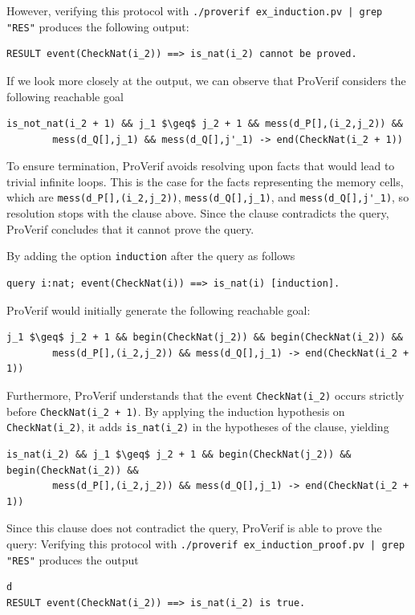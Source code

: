 \documentclass{book}
\begin{document}
However, verifying this protocol with \texttt{./proverif {\docexdir}ex\_induction.pv | grep "RES"} produces the following output:
\begin{lstlisting}[numbers=none]
RESULT event(CheckNat(i_2)) ==> is_nat(i_2) cannot be proved.
\end{lstlisting}
If we look more closely at the output, we can observe that ProVerif considers the following reachable goal
\begin{lstlisting}[numbers=none]
is_not_nat(i_2 + 1) && j_1 $\geq$ j_2 + 1 && mess(d_P[],(i_2,j_2)) &&
		mess(d_Q[],j_1) && mess(d_Q[],j'_1) -> end(CheckNat(i_2 + 1))
\end{lstlisting}
To ensure termination, ProVerif avoids resolving upon facts that would lead to trivial infinite loops. This is the case for the facts representing the memory cells, which are \lstinline!mess(d_P[],(i_2,j_2))!, \lstinline!mess(d_Q[],j_1)!, and \lstinline!mess(d_Q[],j'_1)!, so resolution stops with the clause above. Since the clause contradicts the query, ProVerif concludes that it cannot prove the query.

By adding the option \lstinline!induction! after the query as follows
\begin{lstlisting}[numbers=none]
	query i:nat; event(CheckNat(i)) ==> is_nat(i) [induction].
\end{lstlisting}
ProVerif would initially generate the following reachable goal:
\begin{lstlisting}[numbers=none]
j_1 $\geq$ j_2 + 1 && begin(CheckNat(j_2)) && begin(CheckNat(i_2)) &&
		mess(d_P[],(i_2,j_2)) && mess(d_Q[],j_1) -> end(CheckNat(i_2 + 1))
\end{lstlisting}
Furthermore, ProVerif understands that the event \lstinline!CheckNat(i_2)! occurs strictly before \lstinline!CheckNat(i_2 + 1)!. By applying the induction hypothesis on \lstinline!CheckNat(i_2)!, it adds \lstinline!is_nat(i_2)! in the hypotheses of the clause, yielding
\begin{lstlisting}[numbers=none]
is_nat(i_2) && j_1 $\geq$ j_2 + 1 && begin(CheckNat(j_2)) && begin(CheckNat(i_2)) &&
		mess(d_P[],(i_2,j_2)) && mess(d_Q[],j_1) -> end(CheckNat(i_2 + 1))
\end{lstlisting}
Since this clause does not contradict the query, ProVerif is able to prove the query: Verifying this protocol with \texttt{./proverif {\docexdir}ex\_induction\_proof.pv | grep "RES"} produces the output
\begin{lstlisting}[numbers=none]d
RESULT event(CheckNat(i_2)) ==> is_nat(i_2) is true.
\end{lstlisting}
\end{document}
